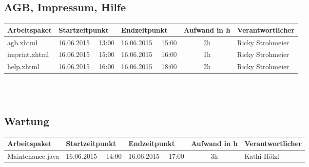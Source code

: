 \begin{landscape}
	\subsection{AGB, Impressum, Hilfe}
	\begin{tabular}{|p{10.3cm}|p{3.2cm}|p{3.2cm}|c|p{3.5cm}|}
		\hline  \textbf{Arbeitspaket} & \textbf{Startzeitpunkt} & \textbf{Endzeitpunkt} & \textbf{Aufwand in h} & \textbf{Verantwortlicher} \\ 
		\hline   agb.xhtml          & 16.06.2015 \ \ 13:00        & 16.06.2015 \ \ 15:00        &  2h                 & Ricky Strohmeier\\
		\hline   imprint.xhtml      & 16.06.2015 \ \ 15:00        & 16.06.2015 \ \ 16:00        &  1h                 & Ricky Strohmeier\\
		\hline   help.xhtml         & 16.06.2015 \ \ 16:00        & 16.06.2015 \ \ 18:00        &  2h                 & Ricky Strohmeier\\
		\hline 
	\end{tabular} \ \\
	\ \\	
	
	\subsection{Wartung}
	\begin{tabular}{|p{10.3cm}|p{3.2cm}|p{3.2cm}|c|p{3.5cm}|}
		\hline  \textbf{Arbeitspaket} & \textbf{Startzeitpunkt} & \textbf{Endzeitpunkt} & \textbf{Aufwand in h} & \textbf{Verantwortlicher} \\ 
		\hline   Maintenance.java         & 16.06.2015 \ \ 14:00       & 16.06.2015  \ \  17:00      &  3h                & Kathi Hölzl\\
		\hline
	\end{tabular}				
\end{landscape}